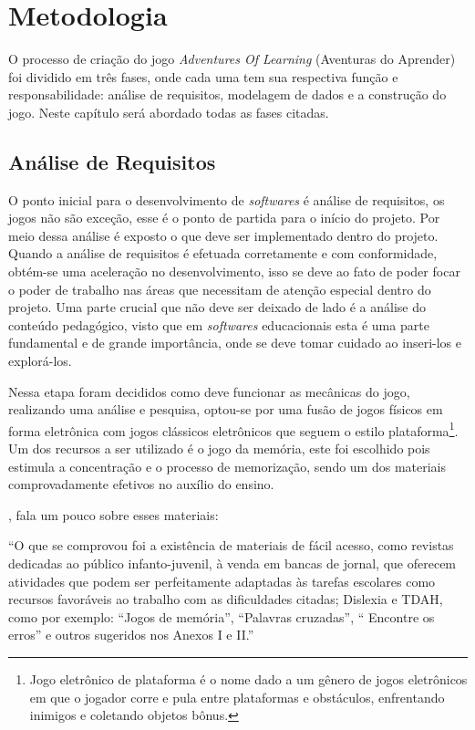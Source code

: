 \documentclass[
	12pt,				%
    oneside,			%
	a4paper,			%
	english,			%
	french,				%
	spanish,			%
	brazil,				%
	]{abntex2}
\begin{document}
			
\chapter{Metodologia}
	O processo de criação do jogo \textit{Adventures Of Learning} (Aventuras do Aprender) foi dividido em três fases, onde cada uma tem sua respectiva função e responsabilidade: análise de requisitos, modelagem de dados e a construção do jogo. Neste capítulo será abordado todas as fases citadas.
	
	\section{Análise de Requisitos}
	
		O ponto inicial para o desenvolvimento de \textit{softwares} é análise de requisitos, os jogos não são exceção, esse é o ponto de partida para o início do projeto. Por meio dessa análise é exposto o que deve ser implementado dentro do projeto. Quando a análise de requisitos é efetuada corretamente e com conformidade, obtém-se uma aceleração no desenvolvimento, isso se deve ao fato de poder focar o poder de trabalho nas áreas que necessitam de atenção especial dentro do projeto. Uma parte crucial que não deve ser deixado de lado é a análise do conteúdo pedagógico, visto que em \textit{softwares} educacionais esta é uma parte fundamental e de grande importância, onde se deve tomar cuidado ao inseri-los e explorá-los.
		 
		Nessa etapa foram decididos como deve funcionar as mecânicas do jogo, realizando uma análise e pesquisa, optou-se por uma fusão de jogos físicos em forma eletrônica com jogos clássicos eletrônicos que seguem o estilo plataforma\footnote{Jogo eletrônico de plataforma é o nome dado a um gênero de jogos eletrônicos em que o jogador corre e pula entre plataformas e obstáculos, enfrentando inimigos e coletando objetos bônus.}. Um dos recursos a ser utilizado é o jogo da memória, este foi escolhido pois estimula a concentração e o processo de memorização, sendo um dos materiais comprovadamente efetivos no auxílio do ensino.
		
		
		, fala um pouco sobre esses materiais:
		\begin{citacao}
			“O que se comprovou  foi a existência de materiais de fácil acesso, como revistas dedicadas ao público infanto-juvenil, à venda em bancas de jornal, que oferecem atividades que podem ser perfeitamente  adaptadas às tarefas escolares como recursos favoráveis ao trabalho com as dificuldades citadas; Dislexia e TDAH, como por exemplo: “Jogos de memória”, “Palavras cruzadas”, “ Encontre os erros” e outros sugeridos nos Anexos I e II.” 
		\end{citacao}
		
\end{document}
